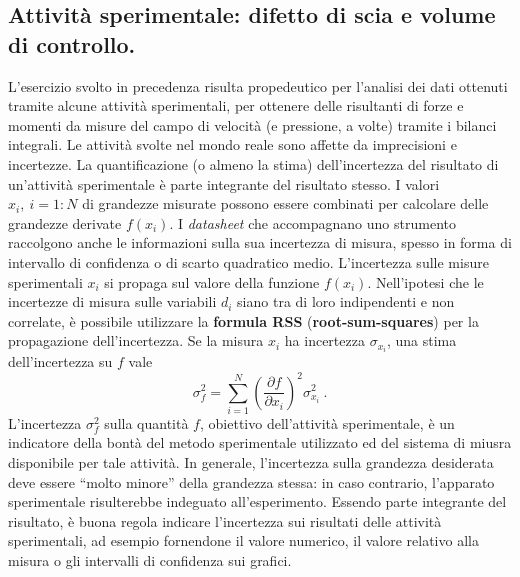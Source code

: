 \subsection{Attività sperimentale: difetto di scia e volume di controllo.}

L'esercizio svolto in precedenza risulta propedeutico per l'analisi dei dati ottenuti tramite alcune attività sperimentali, per ottenere delle risultanti di forze e momenti da misure del campo di velocità (e pressione, a volte) tramite i bilanci integrali.
Le attività svolte nel mondo reale sono affette da imprecisioni e incertezze. La quantificazione (o almeno la stima) dell'incertezza del risultato di un'attività sperimentale è parte integrante del risultato stesso. 
I valori $x_i, \ i=1:N$ di grandezze misurate possono essere combinati per calcolare delle grandezze derivate $f(x_i)$. I \textit{datasheet} che accompagnano uno strumento raccolgono anche le informazioni sulla sua incertezza di misura, spesso in forma di intervallo di confidenza o di scarto quadratico medio. L'incertezza sulle misure sperimentali $x_i$ si propaga sul valore della funzione $f(x_i)$. Nell'ipotesi che le incertezze di misura sulle variabili $d_i$ siano tra di loro indipendenti e non correlate, è possibile utilizzare la \textbf{formula RSS} (\textbf{root-sum-squares}) per la propagazione dell'incertezza. Se la misura $x_i$ ha incertezza $\sigma_{x_i}$, una stima dell'incertezza su $f$ vale
\begin{equation}
  \sigma_f^2 = \sum_{i=1}^{N} \left( \dfrac{\partial f}{\partial x_i} \right)^2 \sigma_{x_i}^2 \ .
\end{equation}
%
L'incertezza $\sigma^2_f$ sulla quantità $f$, obiettivo dell'attività sperimentale, è un indicatore della bontà del metodo sperimentale utilizzato ed del sistema di miusra disponibile per tale attività. In generale, l'incertezza sulla grandezza desiderata deve essere ``molto minore'' della grandezza stessa: in caso contrario, l'apparato sperimentale risulterebbe indeguato all'esperimento.
Essendo parte integrante del risultato, è buona regola indicare l'incertezza sui risultati delle attività sperimentali, ad esempio fornendone il valore numerico, il valore relativo alla misura o gli intervalli di confidenza sui grafici.

